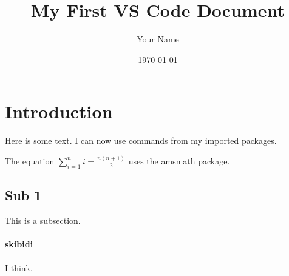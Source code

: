 \documentclass{article}
\title{My First VS Code Document}
\author{Your Name}
\date{\today}
\begin{document}
\maketitle
\section{Introduction}
Here is some text. I can now use commands from my imported packages.

The equation $\sum_{i=1}^{n} i = \frac{n(n+1)}{2}$ uses the amsmath package.
\subsection{Sub 1}
This is a subsection.
\paragraph{skibidi}
I think.
\end{document}
